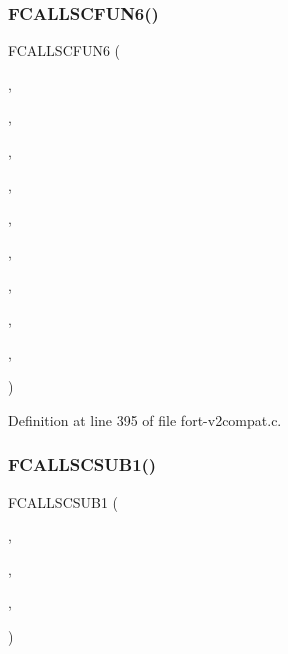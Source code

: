 \subsubsection{\texorpdfstring{F\+C\+A\+L\+L\+S\+C\+F\+U\+N6()}{FCALLSCFUN6()}}
{\footnotesize\ttfamily F\+C\+A\+L\+L\+S\+C\+F\+U\+N6 (\begin{DoxyParamCaption}\item[{\hyperlink{ncfortran_8h_aec6fe8ae8c73cf5133d4ed64f86ff028}{N\+F\+\_\+\+I\+NT}}]{,  }\item[{\hyperlink{nf__v2compat_8c_af8aa6c4a5fcc46f128d3c947b7a9b568}{c\+\_\+ncvdef}}]{,  }\item[{N\+C\+V\+D\+EF}]{,  }\item[{\hyperlink{nf__fortv2_8f90_a7121e237ce771e26edb350028c22f37c}{ncvdef}}]{,  }\item[{N\+C\+ID}]{,  }\item[{S\+T\+R\+I\+NG}]{,  }\item[{T\+Y\+PE}]{,  }\item[{N\+D\+I\+MS}]{,  }\item[{D\+I\+M\+I\+DS}]{,  }\item[{\hyperlink{fort-v2compat_8c_ae2352f39cbd25bcaf1bedbbb12db73fe}{P\+R\+C\+O\+DE}}]{ }\end{DoxyParamCaption})}



Definition at line 395 of file fort-\/v2compat.\+c.

\mbox{\label{fort-v2compat_8c_a53850b774513b597f2d9080a0869f01a}} 
\subsubsection{\texorpdfstring{F\+C\+A\+L\+L\+S\+C\+S\+U\+B1()}{FCALLSCSUB1()}\hspace{0.1cm}{\footnotesize\ttfamily [1/2]}}
{\footnotesize\ttfamily F\+C\+A\+L\+L\+S\+C\+S\+U\+B1 (\begin{DoxyParamCaption}\item[{\hyperlink{nf__v2compat_8c_a94488ba6a21805a4d1f6f8e6c0c41c5e}{c\+\_\+ncpopt}}]{,  }\item[{N\+C\+P\+O\+PT}]{,  }\item[{\hyperlink{nf__fortv2_8f90_aa99b1352748c769427ead3bfaf123fff}{ncpopt}}]{,  }\item[{\hyperlink{fort-v2compat_8c_ad34fd007826863dc1084c1c893ce5934}{N\+C\+O\+P\+TS}}]{ }\end{DoxyParamCaption})}



